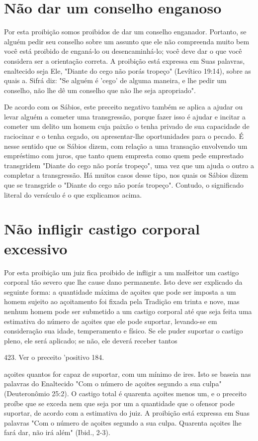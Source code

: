 \begin{itemize}
\begin{enumrate}
\begin{itemize}
\begin{itemize}
\begin{itemize}
\section{Não dar um conselho enganoso}

Por esta proibição somos proibidos de dar um conselho enganador.
Portanto, se alguém pedir seu conselho sobre um assunto que ele não
com­preenda muito bem você está proibido de enganá-lo ou
desencaminhá-lo; você deve dar o que você considera ser a orientação
correta. A proibição está ex­pressa em Suas palavras, enaltecido seja
Ele, "Diante do cego não porás trope­ço" (Levítico 19:14), sobre as
quais a. Sifrá diz: "Se alguém é 'cego' de alguma maneira, e lhe pedir
um conselho, não lhe dê um conselho que não lhe seja apropriado".

De acordo com os Sábios, este preceito negativo também se aplica a
ajudar ou levar alguém a cometer uma transgressão, porque fazer isso é
ajudar e incitar a cometer um delito um homem cuja paixão o tenha
privado de sua capacidade de raciocinar e o tenha cegado, ou
apresentar-lhe oportunidades para o pecado. É nesse sentido que os
Sábios dizem, com relação a uma transa­ção envolvendo um empréstimo com
juros, que tanto quem empresta como quem pede emprestado transgridem
"Diante do cego não porás tropeço", uma vez que um ajuda o outro a
completar a transgressão. Há muitos casos desse tipo, nos quais os
Sábios dizem que se transgride o "Diante do cego não porás tropeço".
Contudo, o significado literal do versículo é o que explicamos acima.

\section{Não infligir castigo corporal excessivo}

Por esta proibição um juiz fica proibido de infligir a um malfeitor um
castigo corporal tão severo que lhe cause dano permanente. Isto deve ser
explicado da seguinte forma: a quantidade máxima de açoites que pode ser
im­posta a um homem sujeito ao açoitamento foi fixada pela Tradição em
trinta e nove, mas nenhum homem pode ser submetido a um castigo corporal
até que seja feita uma estimativa do número de açoites que ele pode
suportar, levando-se em consideração sua idade, temperamento e físico.
Se ele puder su­portar o castigo pleno, ele será aplicado; se não, ele
deverá receber tantos

423. Ver o preceito 'positivo 184.

açoites quantos for capaz de suportar, com um mínimo de ires. Isto se
baseia nas palavras do Enaltecido "Com o número de açoites segundo a sua
culpa" (Deuteronômio 25:2). O castigo total é quarenta açoites menos um,
e o precei­to proíbe que se exceda nem que seja por um a quantidade que
o ofensor pode suportar, de acordo com a estimativa do juiz. A proibição
está expressa em Suas palavras "Com o número de açoites segundo a sua
culpa. Quarenta açoites lhe fará dar, não irá além" (Ibid., 2-3).


\end{itemize}
\end{itemize}
\end{itemize}
\end{enumrate}
\end{itemize}
